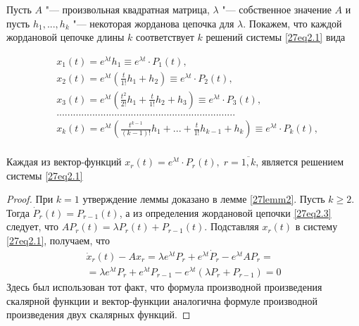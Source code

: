 Пусть $A$ "--- произвольная квадратная матрица, $\lambda$ "--- собственное значение $A$ и пусть $h_1,...,h_k$ "--- некоторая жорданова цепочка для $\lambda$. Покажем, что каждой жордановой цепочке длины $k$ соответствует $k$ решений системы \eqref{27eq2.1} вида

\begin{equation}\label{27eq2.4}
\begin{aligned}
&x_1(t)=e^{\lambda t}h_1\equiv e^{\lambda t}\cdot P_1(t),\\
&x_2(t)=e^{\lambda t}\left( \frac{t}{1!}h_1+h_2\right)\equiv e^{\lambda t}\cdot P_2(t),\\
&x_3(t)=e^{\lambda t}\left( \frac{t^2}{2!}h_1+\frac{t}{1!}h_2+h_3\right)\equiv e^{\lambda t}\cdot P_3(t),\\
&.................................................................\\
&x_k(t)=e^{\lambda t}\left(\frac{t^{k-1}}{(k-1)!}h_1+...+\frac{t}{1!}h_{k-1}+h_k\right)\equiv e^{\lambda t}\cdot P_k(t),\\
\end{aligned}
\end{equation}

\begin{lemm}\label{27lemm3}
Каждая из вектор-функций $x_r(t)=e^{\lambda t}\cdot P_r(t),\; r=\overline{1,k}$, является решением системы \eqref{27eq2.1}
\end{lemm}

\begin{proof}
При $k=1$ утверждение леммы доказано в лемме \ref{27lemm2}. Пусть $k\geq 2$. Тогда $\dot{P}_r(t)=P_{r-1}(t)$, а из определения жордановой цепочки \eqref{27eq2.3} следует, что $AP_r(t)=\lambda P_r(t)+P_{r-1}(t)$. Подставляя $x_r(t)$ в систему \eqref{27eq2.1}, получаем, что
\begin{multline*}
\dot{x}_r(t)-Ax_r=\lambda e^{\lambda t}P_r+e^{\lambda t}\dot{P}_r-e^{\lambda t}AP_r=\\=\lambda e^{\lambda t} P_r+e^{\lambda t}P_{r-1}-e^{\lambda t}(\lambda P_r+P_{r-1})=0
\end{multline*}
Здесь был использован тот факт, что формула производной произведения скалярной функции и вектор-функции аналогична формуле производной произведения двух скалярных функций.
\end{proof}


